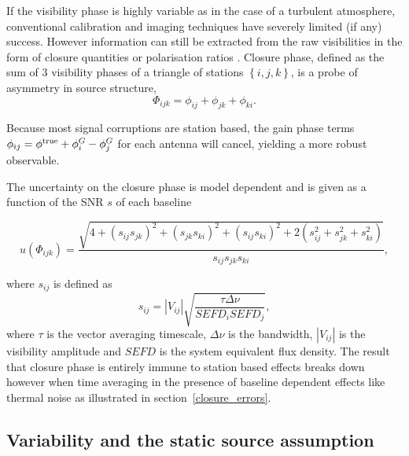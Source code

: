 If the visibility phase is highly variable as in the case of a turbulent atmosphere,  conventional calibration and imaging techniques have severely limited (if any) success. However information can still be extracted from the raw visibilities in the form of closure quantities \citep{Monnier_2007} or polarisation ratios \citep{Fish_2009}. Closure phase, defined as the sum of 3 visibility phases of a triangle of stations $\left\{i,j,k\right\}$, is a probe of asymmetry in source structure,
\begin{equation}
\Phi_{ijk} = \phi_{ij}+\phi_{jk}+\phi_{ki}.
\end{equation}

\noindent Because most signal corruptions are station based, the gain phase terms $\phi_{ij}=\phi^{\rm true}+ \phi^G_i -\phi^G_j$ for each antenna will cancel, yielding a more robust observable. 

The uncertainty on the closure phase is model dependent \citep{Rogers_1995} and is given as a function of the SNR $s$ of each baseline 

\begin{equation}\label{eq:ucp}
u(\Phi_{ijk}) = \frac{\sqrt{4 + (s_{ij}s_{jk})^2 + (s_{jk}s_{ki})^2 + (s_{ij}s_{ki})^2 +
                        2(s_{ij}^2+s_{jk}^2+s_{ki}^2)}}{s_{ij}s_{jk}s_{ki}},
\end{equation}

\noindent where $s_{ij}$ is defined as
\begin{equation}
s_{ij}=|V_{ij}| \sqrt{\frac{ \tau \Delta \nu}{SEFD_i SEFD_j}},
\end{equation}
where $\tau$ is the vector averaging timescale, $\Delta \nu$ is the bandwidth, $|V_{ij}|$ is the visibility amplitude and $SEFD$ is the system equivalent flux density. The result that closure phase is entirely immune to station based effects breaks down however when time averaging in the presence of baseline dependent effects like thermal noise as illustrated in section~\ref{closure_errors}.
 
\subsection{Variability and the static source assumption}

